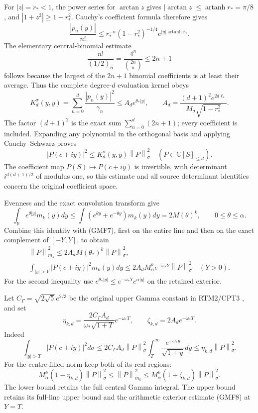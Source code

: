 \documentclass[11pt]{article}
\newcommand{\C}{\mathbb C}
\newcommand{\R}{\mathbb R}
\newcommand{\norm}[1]{\left\lVert#1\right\rVert}
\begin{document}
For \(|z|=r_*<1\), the power series for \(\arctan z\) gives
\(|\arctan z|\le\operatorname{artanh}r_*=\pi/8\), and
\(|1+z^2|\ge1-r_*^2\).
Cauchy's coefficient formula therefore gives
\[
 \frac{|p_n(y)|}{n!}
 \le r_*^{-n}(1-r_*^2)^{-1/4}
                      e^{|y|\operatorname{artanh}r_*}.
\]
The elementary central-binomial estimate
\[
 \frac{n!}{(1/2)_n}=\frac{4^n}{\binom{2n}{n}}\le2n+1
\]
follows because the largest of the \(2n+1\) binomial coefficients
is at least their average.
Thus the complete degree-\(d\) evaluation kernel obeys
\begin{equation}\tag{GMF7}
 K_d^\sigma(y,y)=\sum_{n=0}^d\frac{|p_n(y)|^2}{\gamma_n}
 \le A_de^{\theta_*|y|},\qquad
 A_d=\frac{(d+1)^2 e^{2d\ell_*}}
               {M_\sigma\sqrt{1-r_*^2}}.
\end{equation}
The factor \((d+1)^2\) is the exact sum
\(\sum_{n=0}^d(2n+1)\); every coefficient is included.
Expanding any polynomial in the orthogonal basis and applying
Cauchy--Schwarz proves
\[
 |P(c+iy)|^2\le K_d^\sigma(y,y)\norm P_\sigma^2
 \quad(P\in\C[S]_{\le d}).
\]
The coefficient map \(P(S)\mapsto P(c+iy)\) is invertible,
with determinant \(i^{d(d+1)/2}\) of modulus one, so this
estimate and all source determinant identities concern the
original coefficient space.

Evenness and the exact convolution transform give
\[
 \int_\R e^{\theta|y|}m_k(y)dy
 \le \int(e^{\theta y}+e^{-\theta y})m_k(y)dy
 =2M(\theta)^k,\qquad 0\le\theta\le\alpha.
\]
Combine this identity with (GMF7), first on the entire line
and then on the exact complement of \([-Y,Y]\), to obtain
\begin{equation}\tag{GMF8}
\begin{gathered}
 \norm P_{m_k}^2
 \le2A_dM(\theta_*)^k\norm P_\sigma^2,\\
 \int_{|y|>Y}|P(c+iy)|^2m_k(y)dy
 \le2A_dM_\alpha^k e^{-\omega_*Y}\norm P_\sigma^2
 \quad(Y>0).
\end{gathered}
\end{equation}
For the second inequality use
\(e^{\theta_*|y|}\le e^{-\omega_*Y}e^{\alpha|y|}\)
on the retained exterior.

Let \(C_\Gamma=\sqrt{2\sqrt5}e^{2/3}\) be the original upper
Gamma constant in RTM2/CPT3 \cite{providers,cpt}, and set
\begin{equation}\tag{GMF9}
 \eta_{k,d}=
 \frac{2C_\Gamma A_d}{\omega_*\sqrt{1+T}}e^{-\omega_*T},
 \qquad
 \zeta_{k,d}=2A_de^{-\omega_*T}.
\end{equation}
Indeed
\[
 \int_{|y|>T}|P(c+iy)|^2d\sigma
 \le2C_\Gamma A_d\norm P_\sigma^2
           \int_T^\infty\frac{e^{-\omega_*y}}{\sqrt{1+y}}dy
 \le\eta_{k,d}\norm P_\sigma^2.
\]
For the centre-filled norm keep both of its real regions:
\begin{equation}\tag{GMF10}
 M_\alpha^k(1-\eta_{k,d})\norm P_\sigma^2
 \le\norm P_{\widetilde m_k}^2
 \le M_\alpha^k(1+\zeta_{k,d})\norm P_\sigma^2.
\end{equation}
The lower bound retains the full central Gamma integral.
The upper bound retains its full-line upper bound and the
arithmetic exterior estimate (GMF8) at \(Y=T\).
\end{document}
